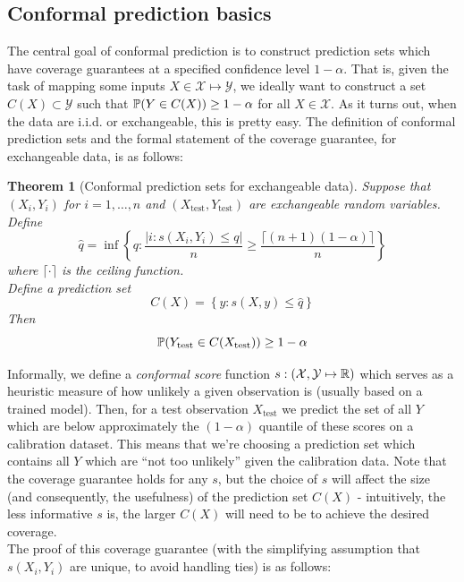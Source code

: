 \documentclass[a4paper, 12pt]{article}
\newtheorem{theorem}{Theorem}
\begin{document}
\subsection{Conformal prediction basics}
\label{sec:basics}
The central goal of conformal prediction is to construct prediction sets which have coverage guarantees at
a specified confidence level $1-\alpha$. That is, given the task of mapping some inputs
$X \in \mathcal{X} \mapsto \mathcal{Y}$, we ideally want to construct a set $C(X) \subset \mathcal{Y}$ such that
$\P(Y \in C(X)) \geq 1 - \alpha$ for all $X \in \mathcal{X}$. As it turns out,
when the data are i.i.d. or exchangeable, this is pretty easy. The definition of conformal prediction sets and the formal statement of the coverage
guarantee, for exchangeable data, is as follows:
\begin{theorem}[Conformal prediction sets for exchangeable data]
    Suppose that $(X_i, Y_i)$ for $i = 1, \ldots, n$ and $(X_{\text{test}}, Y_{\text{test}})$ are exchangeable random variables. \\
    Define
    \[
        \hat{q} = \inf \left\{ q: \frac{\left| i : s(X_i, Y_i) \leq q \right|}{n} \geq \frac{\lceil (n+1)(1-\alpha) \rceil }{n} \right\}
    \]
    where $\lceil \cdot \rceil$ is the ceiling function.\\
    Define a prediction set
    \[
        C(X) = \left\{ y: s(X, y) \leq \hat{q} \right\}
    \]
    Then \[ \P (Y_{\text{test}} \in C(X_{\text{test}})) \geq 1 - \alpha \]
    \label{thm:exchangeable_conformal_prediction}
\end{theorem}
Informally, we define a \textit{conformal score} function $s : (\mathcal{X}, \mathcal{Y} \mapsto \R) $ which
serves as a heuristic measure of how unlikely a given observation is (usually based on a trained model).
Then, for a test observation $X_{\text{test}}$ we predict the set of all $Y$ which are below approximately the $(1-\alpha)$ quantile of these scores on a calibration dataset.
This means that we're choosing a prediction set which contains all $Y$ which are ``not too unlikely'' given the calibration data.
Note that the coverage guarantee holds for any $s$, but the choice of $s$ will affect the size (and consequently, the usefulness) of the prediction set $C(X)$ - intuitively,
the less informative $s$ is, the larger $C(X)$ will need to be to achieve the desired coverage. \\
The proof of this coverage guarantee (with the simplifying assumption that $s(X_i, Y_i)$ are unique, to avoid handling ties) is as follows:
\end{document}
